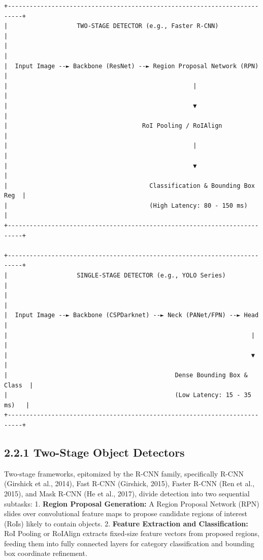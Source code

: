 \begin{verbatim}
+--------------------------------------------------------------------------+
|                   TWO-STAGE DETECTOR (e.g., Faster R-CNN)                |
|                                                                          |
|  Input Image --► Backbone (ResNet) --► Region Proposal Network (RPN)     |
|                                                   |                      |
|                                                   ▼                      |
|                                     RoI Pooling / RoIAlign               |
|                                                   |                      |
|                                                   ▼                      |
|                                       Classification & Bounding Box Reg  |
|                                       (High Latency: 80 - 150 ms)        |
+--------------------------------------------------------------------------+

+--------------------------------------------------------------------------+
|                   SINGLE-STAGE DETECTOR (e.g., YOLO Series)              |
|                                                                          |
|  Input Image --► Backbone (CSPDarknet) --► Neck (PANet/FPN) --► Head     |
|                                                                   |      |
|                                                                   ▼      |
|                                              Dense Bounding Box & Class  |
|                                              (Low Latency: 15 - 35 ms)   |
+--------------------------------------------------------------------------+
\end{verbatim}

\subsection{2.2.1 Two-Stage Object
Detectors}\label{two-stage-object-detectors}

Two-stage frameworks, epitomized by the R-CNN family, specifically R-CNN
(Girshick et al., 2014), Fast R-CNN (Girshick, 2015), Faster R-CNN (Ren
et al., 2015), and Mask R-CNN (He et al., 2017), divide detection into
two sequential subtasks: 1. \textbf{Region Proposal Generation:} A
Region Proposal Network (RPN) slides over convolutional feature maps to
propose candidate regions of interest (RoIs) likely to contain objects.
2. \textbf{Feature Extraction and Classification:} RoI Pooling or
RoIAlign extracts fixed-size feature vectors from proposed regions,
feeding them into fully connected layers for category classification and
bounding box coordinate refinement.


